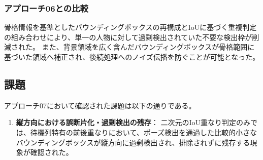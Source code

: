 \subsubsection{アプローチ06との比較}
骨格情報を基準としたバウンディングボックスの再構成とIoUに基づく重複判定の組み合わせにより、単一の人物に対して過剰検出されていた不要な検出枠が削減された。
また、背景領域を広く含んだバウンディングボックスが骨格範囲に基づいた領域へ補正され、後続処理へのノイズ伝播を防ぐことが可能となった。

\subsection{課題}
アプローチ07において確認された課題は以下の通りである。

\begin{enumerate}
    \item \textbf{縦方向における誤断片化・過剰検出の残存}：
    二次元のIoU重なり判定のみでは、待機列特有の前後重なりにおいて、ポーズ検出を通過した比較的小さなバウンディングボックスが縦方向に過剰検出され、排除されずに残存する現象が確認された。
\end{enumerate}

\clearpage
